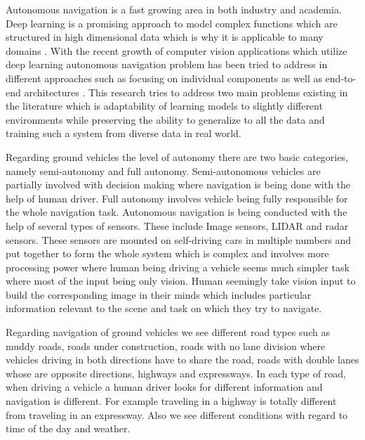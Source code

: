 Autonomous navigation is a fast growing area in both industry and academia. Deep learning is a promising approach to model complex functions which are structured in high dimensional data which is why it is applicable to many domains \cite{lecun2015deep}. With the recent growth of computer vision applications which utilize deep learning autonomous navigation problem has been tried to address in different approaches such as focusing on individual components \cite{kong2010general,oren1997pedestrian,bertozzi1998gold} as well as end-to-end architectures \cite{bojarski2016end, xu2016end}. This research tries to address two main problems existing in the literature which is adaptability of learning models to slightly different environments while preserving the ability to generalize to all the data and training such a system from diverse data in real world.

Regarding ground vehicles the level of autonomy there are two basic categories, namely semi-autonomy and full autonomy. Semi-autonomous vehicles are partially involved with decision making where navigation is being done with the help of human driver. Full autonomy involves vehicle being fully responsible for the whole navigation task. Autonomous navigation is being conducted with the help of several types of sensors. These include Image sensors, LIDAR and radar sensors. These sensors are mounted on self-driving cars in multiple numbers and put together to form the whole system which is complex and involves more processing power where human being driving a vehicle seems much simpler task where most of the input being only vision. Human seemingly take vision input to build the corresponding image in their minds which includes particular information relevant to the scene and task on which they try to navigate.

Regarding navigation of ground vehicles we see different road types such as muddy roads, roads under construction, roads with no lane division where vehicles driving in both directions have to share the road, roads with double lanes whose are opposite directions, highways and expressways. In each type of road, when driving a vehicle a human driver looks for different information and navigation is different. For example traveling in a highway is totally different from traveling in an expressway.  Also we see different conditions with regard to time of the day and weather. 

